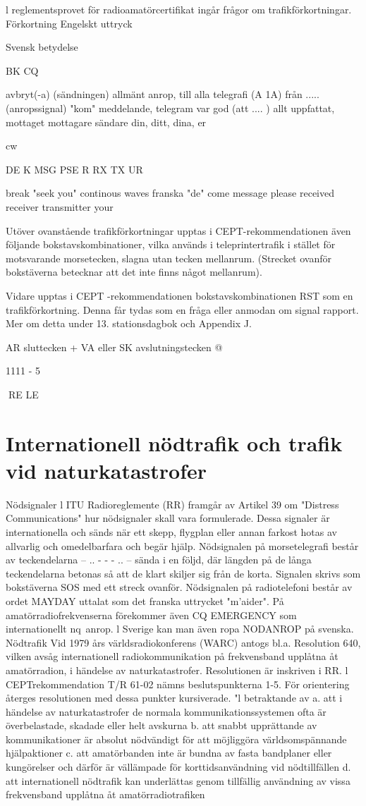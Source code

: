 l reglementsprovet för radioamatörcertifikat ingår frågor om trafikförkortningar.
Förkortning Engelskt uttryck

Svensk betydelse

BK
CQ

avbryt(-a) (sändningen)
allmänt anrop, till alla
telegrafi (A 1A)
från ..... (anropssignal)
"kom"
meddelande, telegram
var god (att .... )
allt uppfattat, mottaget
mottagare
sändare
din, ditt, dina, er

cw

DE
K
MSG
PSE
R
RX
TX
UR

break
"seek you"
continous waves
franska "de"
come
message
please
received
receiver
transmitter
your

Utöver ovanstående trafikförkortningar upptas i CEPT-rekommendationen även följande bokstavskombinationer, vilka används i
teleprintertrafik i stället för motsvarande
morsetecken, slagna utan tecken mellanrum.
(Strecket ovanför bokstäverna betecknar
att det inte finns något mellanrum).

Vidare upptas i CEPT -rekommendationen bokstavskombinationen RST som en
trafikförkortning. Denna får tydas som en
fråga eller anmodan om signal rapport.
Mer om detta under 13. stationsdagbok
och Appendix J.

AR
sluttecken
+
VA eller SK avslutningstecken @

1111 - 5

RE LE
\section{Internationell nödtrafik och trafik vid naturkatastrofer}
Nödsignaler
l ITU Radioreglemente (RR) framgår av Artikel 39 om "Distress Communications" hur
nödsignaler skall vara formulerade. Dessa
signaler är internationella och sänds när ett
skepp, flygplan eller annan farkost hotas av
allvarlig och omedelbarfara och begär hjälp.
Nödsignalen på morsetelegrafi består av
teckendelarna -- .. - - - .. -- sända i en följd,
där längden på de långa teckendelarna betonas så att de klart skiljer sig från de korta.
Signalen skrivs som bokstäverna SOS med
ett streck ovanför.
Nödsignalen på radiotelefoni består av
ordet MAYDAY uttalat som det franska uttrycket "m'aider".
På amatörradiofrekvenserna förekommer
även CQ EMERGENCY som internationellt
nq~anrop. l Sverige kan man även ropa
NODANROP på svenska.
Nödtrafik
Vid 1979 års världsradiokonferens (WARC)
antogs bl.a. Resolution 640, vilken avsåg
internationell radiokommunikation på frekvensband upplåtna åt amatörradion, i händelse av naturkatastrofer.
Resolutionen är inskriven i RR. l CEPTrekommendation T/R 61-02 nämns beslutspunkterna 1-5. För orientering återges resolutionen med dessa punkter kursiverade.
"l betraktande av
a. att i händelse av naturkatastrofer de normala kommunikationssystemen ofta är
överbelastade, skadade eller helt avskurna
b. att snabbt upprättande av kommunikationer är absolut nödvändigt för att möjliggöra världsomspännande hjälpaktioner
c. att amatörbanden inte är bundna av fasta
bandplaner eller kungörelser och därför
är vällämpade för korttidsanvändning vid
nödtillfällen
d. att internationell nödtrafik kan underlättas genom tillfällig användning av vissa
frekvensband upplåtna åt amatörradiotrafiken

